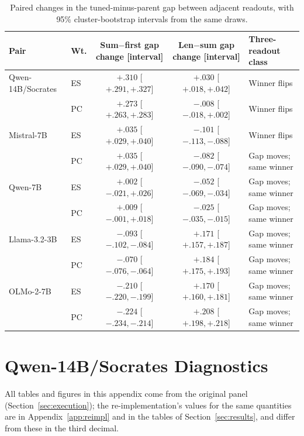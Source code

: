 \documentclass[11pt]{article}
\begin{document}
\begin{table}[t]
\centering
\scriptsize
\setlength{\tabcolsep}{5pt}
\begin{tabular}{@{}llccl@{}}
\toprule
Pair & Wt. & Sum$-$first gap change [interval] & Len$-$sum gap change [interval] & Three-readout class \\
\midrule
Qwen-14B/Socrates & ES & $+.310$ [$+.291,+.327$] & $+.030$ [$+.018,+.042$] & Winner flips \\
 & PC & $+.273$ [$+.263,+.283$] & $-.008$ [$-.018,+.002$] & Winner flips \\
Mistral-7B & ES & $+.035$ [$+.029,+.040$] & $-.101$ [$-.113,-.088$] & Winner flips \\
 & PC & $+.035$ [$+.029,+.040$] & $-.082$ [$-.090,-.074$] & Gap moves; same winner \\
Qwen-7B & ES & $+.002$ [$-.021,+.026$] & $-.052$ [$-.069,-.034$] & Gap moves; same winner \\
 & PC & $+.009$ [$-.001,+.018$] & $-.025$ [$-.035,-.015$] & Gap moves; same winner \\
Llama-3.2-3B & ES & $-.093$ [$-.102,-.084$] & $+.171$ [$+.157,+.187$] & Gap moves; same winner \\
 & PC & $-.070$ [$-.076,-.064$] & $+.184$ [$+.175,+.193$] & Gap moves; same winner \\
OLMo-2-7B & ES & $-.210$ [$-.220,-.199$] & $+.170$ [$+.160,+.181$] & Gap moves; same winner \\
 & PC & $-.224$ [$-.234,-.214$] & $+.208$ [$+.198,+.218$] & Gap moves; same winner \\
\bottomrule
\end{tabular}
\caption{Paired changes in the tuned-minus-parent gap between adjacent
readouts, with 95\% cluster-bootstrap intervals from the same draws.}
\label{tab:five-pair-classification}
\end{table}









\section{Qwen-14B/Socrates Diagnostics}

All tables and figures in this appendix come from the original panel (Section~\ref{sec:execution}); the re-implementation's values for the same quantities are in Appendix~\ref{app:reimpl} and in the tables of Section~\ref{sec:results}, and differ from these in the third decimal.
\end{document}
